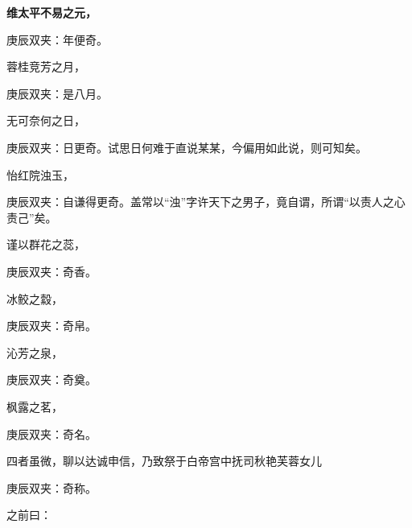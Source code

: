 \begin{qute2sp}
    \bfseries
    维太平不易之元，\begin{note}庚辰双夹：年便奇。\end{note}蓉桂竞芳之月，\begin{note}庚辰双夹：是八月。\end{note}无可奈何之日，\begin{note}庚辰双夹：日更奇。试思日何难于直说某某，今偏用如此说，则可知矣。\end{note}怡红院浊玉，\begin{note}庚辰双夹：自谦得更奇。盖常以“浊”字许天下之男子，竟自谓，所谓“以责人之心责己”矣。\end{note}谨以群花之蕊，\begin{note}庚辰双夹：奇香。\end{note}冰鲛之縠，\begin{note}庚辰双夹：奇帛。\end{note}沁芳之泉，\begin{note}庚辰双夹：奇奠。\end{note}枫露之茗，\begin{note}庚辰双夹：奇名。\end{note}四者虽微，聊以达诚申信，乃致祭于白帝宫中抚司秋艳芙蓉女儿\begin{note}庚辰双夹：奇称。\end{note}之前曰：




\end{qute2sp}
